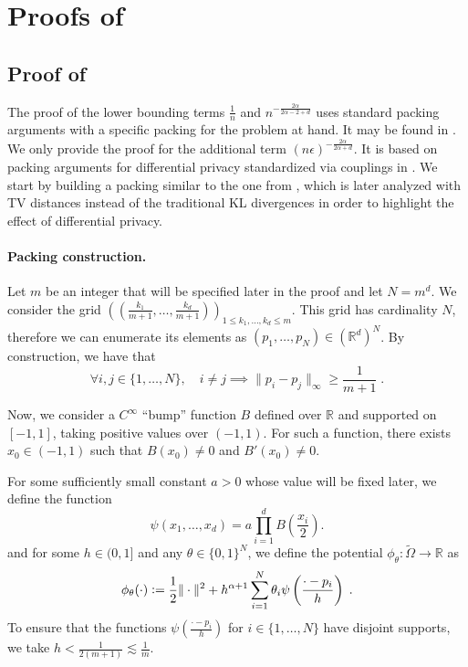 \documentclass{article}
\theoremstyle{plain}
\theoremstyle{definition}
\theoremstyle{remark}
\newcommand{\R}[0]{\mathbb{R}}
\newcommand{\eqdef}{\vcentcolon=}
\newcommand\p[1]{\left( {#1}\right)}
\begin{document}
\newpage

\section{Proofs of }

\subsection{Proof of }
\label{sec:proof_of_lowerbound}

The proof of the lower bounding terms $\frac{1}{n}$ and $n^{- \frac{2 \alpha}{2 \alpha - 2 + d}}$ uses standard packing arguments \cite{tsybakov2003introduction} with a specific packing for the problem at hand. It may be found in \cite{hutter2021minimax}. We only provide the proof for the additional term $(n\epsilon)^{-\frac{2 \alpha}{2 \alpha + d}}$. It is based on packing arguments for differential privacy standardized via couplings in \cite{acharya2018differentially,acharya2021differentially,lalanne2022statistical}. 
We start by building a packing similar to the one from \cite{hutter2021minimax}, which is later analyzed with TV distances instead of the traditional KL divergences in order to highlight the effect of differential privacy.


    \paragraph{Packing construction.}

    Let $m$ be an integer that will be specified later in the proof and let $N = m^d$. 
    We consider the grid $\p{\p{\frac{k_1}{m+1}, \dots, \frac{k_d}{m+1}}}_{1 \leq k_1, \dots, k_d \leq m}$.
This grid has cardinality $N$, therefore we can enumerate its elements as $(p_1,\dots, p_N) \in (\R^d)^N$. 
By construction, we have that 
\begin{equation}
    \forall i, j \in \{1, \dots, N \}, \quad i \neq j \implies \| p_i - p_j\|_{\infty} \geq \frac{1}{m+1} \;.
\end{equation}


Now, we consider a $C^\infty$ ``bump'' function $B$ defined over $\R$ and supported on $[-1, 1]$, taking positive values over $(-1,1)$. 
For such a function, there exists $x_0 \in (-1, 1)$ such that $B(x_0) \neq 0$ and $B'(x_0) \neq 0$. 

For some sufficiently small constant $a>0$ whose value will be fixed later, we define the function 
\begin{equation}
    \psi(x_1, \dots, x_d) = a \prod_{i=1}^d B \p{\frac{x_i}{2}}.
\end{equation}
and for some $h\in(0,1]$ and any $\theta \in \{0, 1 \}^{N}$, we define the potential $ \phi_{\theta}:\tilde{\Omega}\to\R$ as  
\begin{equation}
\label{eq:definitionpacking}
    \phi_{\theta}(\cdot) \eqdef \frac{1}{2} \| \cdot\|^2 + h^{\alpha + 1} \sum_{i = 1}^{N} \theta_i \psi \p{\frac{\cdot - p_i}{h}} \;.
\end{equation}
To ensure that the functions $ \psi \p{\frac{\cdot - p_i}{h}}$ for $i \in \{1,\dots,N\}$ have disjoint supports, we take $h < \frac{1}{2(m+1)} \lesssim \frac{1}{m}$.
\end{document}
